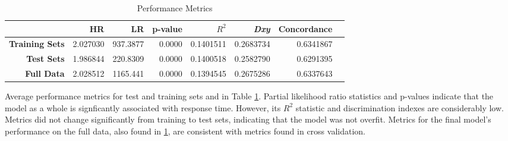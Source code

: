 \documentclass{article}
\begin{document}
\begin{table}[!htbp]
\centering
\begin{tabular}{| r | r | r | r | r  | r | r | r |}
  \hline
 & \textbf{HR} & \textbf{LR} & \textbf{p-value} & \textbf{$R^2$} & \textbf{\textit{Dxy}} & \textbf{Concordance} \\ 
  \hline
  \textbf{Training Sets} & 2.027030 & 937.3877 & 0.0000 & 0.1401511 & 0.2683734 & 0.6341867 \\ 
  \textbf{Test Sets} & 1.986844 & 220.8309 & 0.0000 & 0.1400518 & 0.2582790 & 0.6291395 \\
  \textbf{Full Data} & 2.028512 & 1165.441 & 0.0000 & 0.1394545 & 0.2675286 & 0.6337643 \\ 
   \hline
\end{tabular}
\caption{Performance Metrics} 
\label{table:cv}
\end{table}

Average performance metrics for test and training sets and in Table \ref{table:cv}. Partial likelihood ratio statistics and p-values indicate that the model as a whole is signficantly associated with response time. However, its $R^2$ statistic and discrimination indexes are considerably low. Metrics did not change significantly from training to test sets, indicating that the model was not overfit. Metrics for the final model's performance on the full data, also found in \ref{table:cv}, are consistent with metrics found in cross validation.
\end{document}
